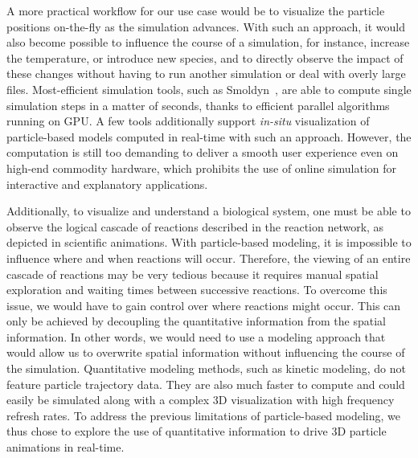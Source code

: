 A more practical workflow for our use case would be to visualize the particle positions on-the-fly as the simulation advances.
With such an approach, it would also become possible to influence the course of a simulation, for instance, increase the temperature, or introduce new species, and to directly observe the impact of these changes without having to run another simulation or deal with overly large files.
Most-efficient simulation tools, such as Smoldyn~\cite{andrews2010detailed}, are able to compute single simulation steps in a matter of seconds, thanks to efficient parallel algorithms running on GPU.
A few tools additionally support \textit{in-situ} visualization of particle-based models computed in real-time with such an approach.
However, the computation is still too demanding to deliver a smooth user experience even on high-end commodity hardware, which prohibits the use of online simulation for interactive and explanatory applications.

Additionally, to visualize and understand a biological system, one must be able to observe the logical cascade of reactions described in the reaction network, as depicted in scientific animations.
With particle-based modeling, it is impossible to influence where and when reactions will occur.
Therefore, the viewing of an entire cascade of reactions may be very tedious because it requires manual spatial exploration and waiting times between successive reactions.
To overcome this issue, we would have to gain control over where reactions might occur.
This can only be achieved by decoupling the quantitative information from the spatial information.
In other words, we would need to use a modeling approach that would allow us to overwrite spatial information without influencing the course of the simulation.
Quantitative modeling methods, such as kinetic modeling, do not feature particle trajectory data.
They are also much faster to compute and could easily be simulated along with a complex 3D visualization with high frequency refresh rates.
To address the previous limitations of particle-based modeling, we thus chose to explore the use of quantitative information to drive 3D particle animations in real-time.


